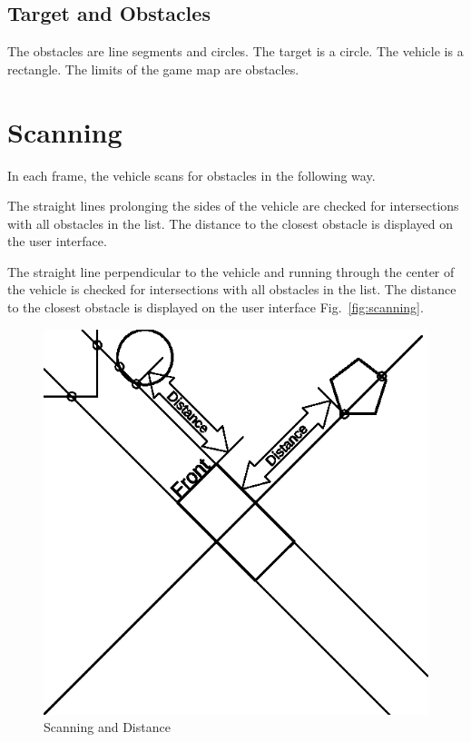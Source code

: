 \documentclass[11pt]{article}
\newcommand{\figref}[1]{Fig.~\eqref{#1}}
\begin{document}
\subsection{Target and Obstacles}
\label{sec:obstacles}

The obstacles are line segments and circles. The target is a circle. The
vehicle is a rectangle. The limits of the game map are obstacles.

\pagebreak
\section{Scanning}
\label{sec:scanning}
In each frame, the vehicle scans for obstacles in the following way.

The straight lines prolonging the sides of the vehicle are checked for
intersections with all obstacles in the list. The distance to the closest 
obstacle is displayed on the user interface.

The straight line perpendicular to the vehicle and running through the center
of the vehicle is checked for intersections with all obstacles in the list.
The distance to the closest obstacle is displayed on the user interface
\figref{fig:scanning}.

\begin{figure}
    \centering
    \includegraphics{scanning.eps}
    \caption{Scanning and Distance}\label{fig:scanning}
\end{figure}
\end{document}
